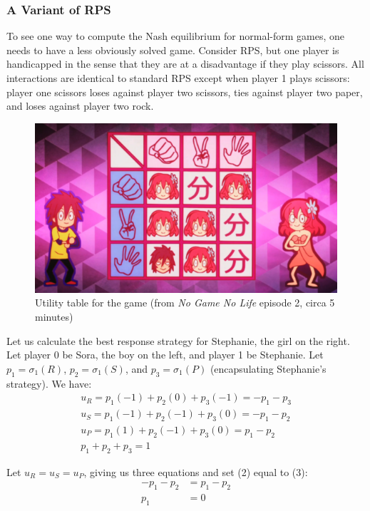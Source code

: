 \documentclass[11pt, oneside]{article}
\begin{document}
\subsubsection{A Variant of RPS}

To see one way to compute the Nash equilibrium for normal-form games,
one needs to have a less obviously solved game. Consider RPS, but one
player is handicapped in the sense that they are at a disadvantage if they play
scissors. All interactions are identical to standard RPS
except when player 1 plays scissors:
player one scissors loses against player two scissors,
ties against player two paper, and loses against player two rock.

\begin{figure}[h!]
  \centering
  \includegraphics[scale=0.42]{rps_table}
  \caption{Utility table for the game (from \textit{No Game No Life} episode 2, circa 5 minutes)}
\end{figure}

Let us calculate the best response strategy for Stephanie, the girl on the right.
Let player 0 be Sora, the boy on the left, and player 1 be Stephanie.
Let \( p_1 = \sigma_1 (R) \), \( p_2 = \sigma_1 (S) \), and \( p_3 = \sigma_1 (P) \)
(encapsulating Stephanie's strategy).
We have:
\begin{gather}
u_R = p_1 (-1) + p_2 (0) + p_3(-1) = -p_1 - p_3 \\
u_S = p_1 (-1) + p_2 (-1) + p_3(0) = -p_1 - p_2 \\
u_P = p_1 (1) + p_2 (-1) + p_3(0)  =  p_1 - p_2 \\
p_1 + p_2 + p_3 = 1
\end{gather}

Let \( u_R = u_S = u_P \), giving us three equations and set (2) equal to (3):
\begin{align*}
-p_1 - p_2 &= p_1 - p_2 \\
p_1 &= 0
\end{align*}
\end{document}
